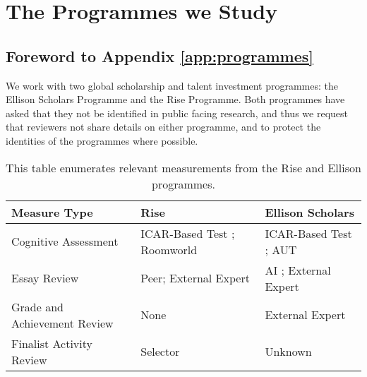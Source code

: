 

\chapter{\label{app:programmes}The Programmes we Study}

\minitoc
\section{Foreword to Appendix \ref{app:programmes}}
We work with two global scholarship and talent investment programmes: the Ellison Scholars Programme and the Rise Programme. Both programmes have asked that they not be identified in public facing research, and thus we request that reviewers not share details on either programme, and to protect the identities of the programmes where possible.

\begin{table}[htbp]
    \centering
    \caption{This table enumerates relevant measurements from the Rise and Ellison programmes.}
    \label{tab:measures}
    \begin{tabular}{l | p{} p{}}
        \toprule
        Measure Type & Rise & Ellison Scholars \\
        \midrule
        Cognitive Assessment & ICAR-Based Test \cite{condon2014international}; Roomworld \cite{Dumbalska_Bhatti_Ali_Summerfield_2023} & ICAR-Based Test \cite{condon2014international}; AUT \cite{guilford1967creativity,organisciak_beyond_2023} \\
        Essay Review & Peer; External Expert & AI \cite{xiao2024humanaicollaborativeessayscoring}; External Expert \\
        Grade and Achievement Review & None & External Expert \\
        Finalist Activity Review & Selector & Unknown \\
        \bottomrule
    \end{tabular}
  \end{table}
  
